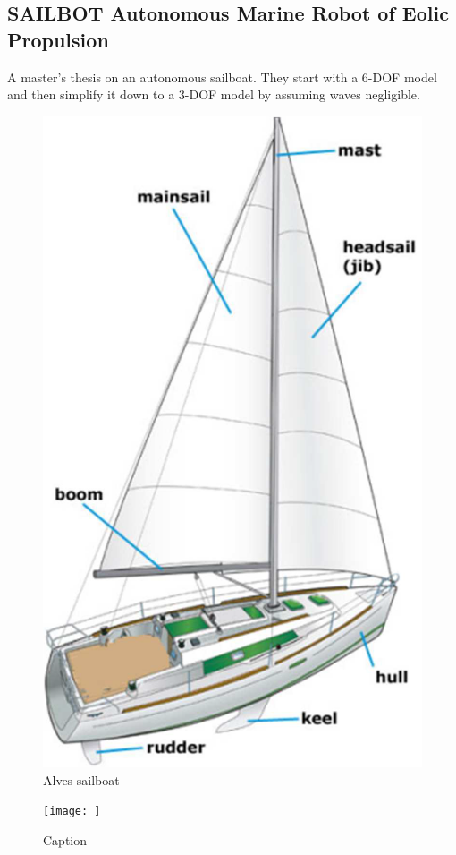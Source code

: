 \documentclass[conference]{IEEEtran}
\begin{document}
\subsection{SAILBOT Autonomous Marine Robot of Eolic Propulsion} \cite{Alves2010}  A master's thesis on an autonomous sailboat. They start with a 6-DOF model and then simplify it down to a 3-DOF model by assuming waves negligible.
\begin{figure}
    \centering
    \includegraphics{documents/figures/alves_sailboat.png}
    \caption{Alves sailboat \cite{Alves2010}}
    \label{fig:alves_sailboat}
\end{figure}
\begin{figure}
    \centering
    \texttt{[image: ]}
    \caption{Caption}
    \label{fig:my_label}
\end{figure}
\end{document}
